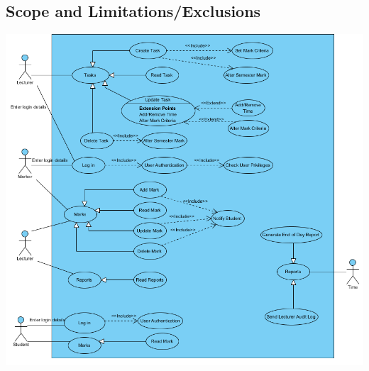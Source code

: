 \documentclass[12pt]{article}
\begin{document}
  \subsection{Scope and Limitations/Exclusions}
  \begin{center}
  \includegraphics[width=150mm]{UseCaseDiagram1.png}  
  \end{center}
\end{document}
